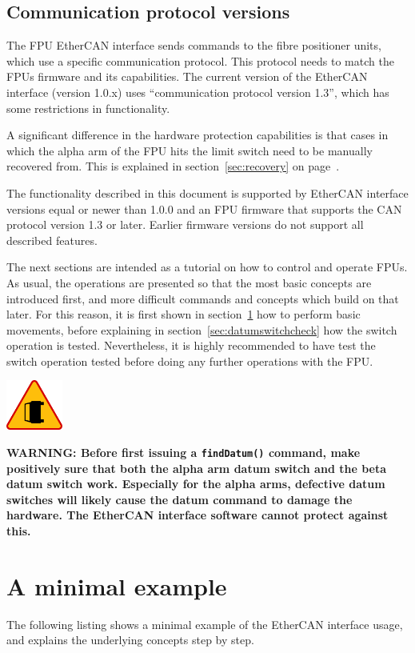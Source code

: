 \documentclass[11pt,a4paper]{scrartcl}
\newenvironment{warning}{\begin{framed}\includegraphics[width=5em]{accident-area-ahead.png}
}{\end{framed}}
\begin{document}
\subsection{Communication protocol versions}
 
 The FPU EtherCAN interface
sends commands to the fibre positioner units, which use a specific
communication protocol. This protocol needs to match the FPUs firmware
and its capabilities. The current version of the EtherCAN interface (version
1.0.x) uses ``communication protocol version 1.3'', which has some
restrictions in functionality.

A significant difference in the hardware protection capabilities is
that cases in which the alpha arm of the FPU hits the limit switch
need to be manually recovered from. This is explained in
section~\ref{sec:recovery} on page~\pageref{sec:recovery}.


The functionality described in this document is supported by EtherCAN interface
versions equal or newer than 1.0.0 and an FPU  firmware that supports the
CAN protocol version 1.3 or later. Earlier firmware versions do not
support all described features.

The next sections are intended as a tutorial on how to control and
operate FPUs. As usual, the operations are presented so that the most
basic concepts are introduced first, and more difficult commands and
concepts which build on that later. For this reason, it is first shown
in section~\ref{sec:minimalexample} how to perform basic movements,
before explaining in section~\ref{sec:datumswitchcheck} how the switch
operation is tested. Nevertheless, it is highly recommended to have
test the switch operation tested before doing any further operations
with the FPU.

\begin{warning}
  \textbf{WARNING: Before first issuing a \texttt{findDatum()}
    command, make positively sure that both the alpha arm datum switch
    and the beta datum switch work. Especially for the alpha arms,
    defective datum switches will likely cause the datum command to
    damage the hardware. The EtherCAN interface software cannot protect against
    this.}
\end{warning}


\section{A minimal example}
\label{sec:minimalexample}
The following listing shows a minimal example of the
EtherCAN interface usage, and explains the underlying concepts
step by step.
\end{document}
